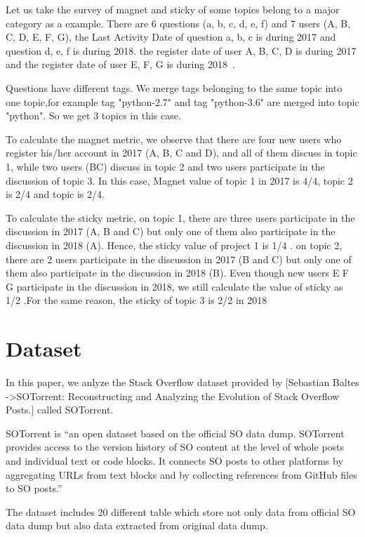 \documentclass[conference]{IEEEtran}
\begin{document}
Let us take the survey of magnet and sticky of some topics belong to a major category as a example. There are 6 questions (a, b, c, d, e, f) and 7 users (A, B, C, D, E, F, G), the Last Activity Date of question a, b, c is during 2017 and question d, e, f is during 2018. the register date of user A, B, C, D is during 2017 and the register date of user E, F, G is during 2018~\cite{yamashita2016magnet}.

Questions have different tags. We merge tags belonging to the same topic into one topic,for example tag "python-2.7" and tag "python-3.6" are merged into topic "python". So we get 3 topics in this case.

To calculate the magnet metric, we observe that there are four new users who register his/her account in 2017 (A, B, C and D), and all of them discuss in topic 1, while two users (BC) discuss in topic 2 and two users participate in the discussion of topic 3. In this case, Magnet value of topic 1 in 2017 is 4/4, topic 2 is 2/4 and topic is 2/4.

To calculate the sticky metric, on topic 1, there are three users participate in the discussion in 2017 (A, B and C) but only one of them also participate in the discussion in 2018 (A). Hence, the sticky value of project 1 is 1/4 . on topic 2, there are 2 users participate in the discussion in 2017 (B and C) but only one of them also participate in the discussion in 2018 (B). Even though new users E F G participate in the discussion in 2018, we still calculate the value of sticky as 1/2 .For the same reason, the sticky of topic 3 is 2/2 in {2018}

\section{Dataset}
In this paper, we anlyze the Stack Overflow dataset provided by [Sebastian Baltes ->SOTorrent: Reconstructing and Analyzing the Evolution of Stack Overflow Posts.] called SOTorrent. 

SOTorrent is “an open dataset based on the official SO data dump. SOTorrent provides access to the version history of SO content at the level of whole posts and individual text or code blocks. It connects SO posts to other platforms by aggregating URLs from text blocks and by collecting references from GitHub files to SO posts.”

The dataset includes 20 different table which store not only data from official SO data dump but also data extracted from original data dump.
\end{document}
